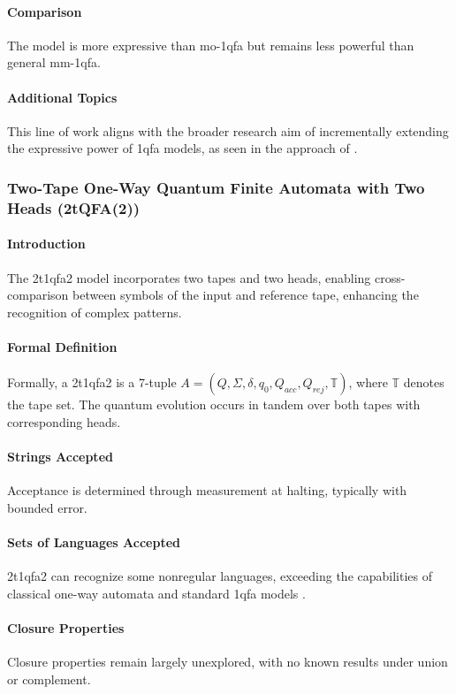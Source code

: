 \paragraph{Comparison}
The model is more expressive than \gls{mo-1qfa} but remains less powerful than general \gls{mm-1qfa}.

\paragraph{Additional Topics}
This line of work aligns with the broader research aim of incrementally extending the expressive power of \gls{1qfa} models, as seen in the approach of \cite{ciamarra2001quantum}.

\subsubsection{Two-Tape One-Way Quantum Finite Automata with Two Heads (2tQFA(2))}
\paragraph{Introduction}
The \gls{2t1qfa2} model incorporates two tapes and two heads, enabling cross-comparison between symbols of the input and reference tape, enhancing the recognition of complex patterns.

\paragraph{Formal Definition}
Formally, a \gls{2t1qfa2} is a 7-tuple \( A = (Q, \Sigma, \delta, q_0, Q_{acc}, Q_{rej}, \mathbb{T}) \), where \( \mathbb{T} \) denotes the tape set. The quantum evolution occurs in tandem over both tapes with corresponding heads.

\paragraph{Strings Accepted}
Acceptance is determined through measurement at halting, typically with bounded error.

\paragraph{Sets of Languages Accepted}
\gls{2t1qfa2} can recognize some nonregular languages, exceeding the capabilities of classical one-way automata and standard \gls{1qfa} models \cite{ganguly20162}.

\paragraph{Closure Properties}
Closure properties remain largely unexplored, with no known results under union or complement.

